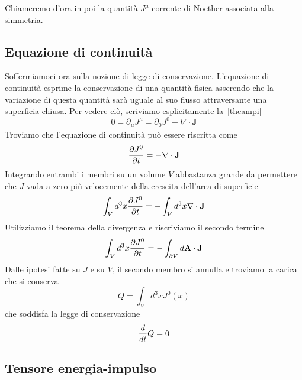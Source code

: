     Chiameremo d'ora in poi la quantità $J^\mu$ corrente di Noether associata alla simmetria. 

\subsection{Equazione di continuità}
    Soffermiamoci ora sulla nozione di legge di conservazione. L'equazione di continuità esprime la conservazione di una quantità fisica asserendo che la variazione di questa quantità sarà uguale al suo flusso attraversante una superficia chiusa. Per vedere ciò, scriviamo esplicitamente la~\eqref{thcampi}
    \begin{equation}
        0 = \partial_\mu J^\mu = \partial_0 J^0 + \nabla \cdot \mathbf J
    \end{equation}
    Troviamo che l'equazione di continuità può essere riscritta come 
    \begin{equation*}
        \frac{\partial J^0}{\partial t} = - \nabla \cdot \mathbf J
    \end{equation*}
    Integrando entrambi i membri su un volume $V$ abbastanza grande da permettere che $J$ vada a zero più velocemente della crescita dell'area di superficie
    \begin{equation*}
        \int_V d^3 x \frac{\partial J^0}{\partial t} = - \int_V d^3 x \nabla \cdot \mathbf J
    \end{equation*} 
    Utilizziamo il teorema della divergenza e riscriviamo il secondo termine 
    \begin{equation*}
        \int_V d^3 x \frac{\partial J^0}{\partial t} = - \int_{\partial V} d \mathbf A \cdot \mathbf J
    \end{equation*} 
    Dalle ipotesi fatte su $J$ e su $V$, il secondo membro si annulla e troviamo la carica che si conserva 
    \begin{equation*}
        Q = \int_V d^3 x J^0(x)
    \end{equation*} 
    che soddisfa la legge di conservazione
    \begin{equation*}
        \frac{d}{dt} Q = 0 
    \end{equation*}

\subsection{Tensore energia-impulso}

